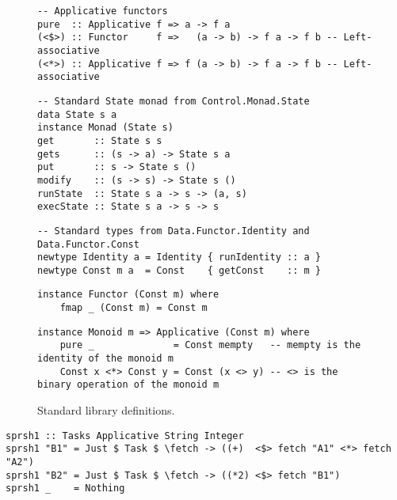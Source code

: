 \begin{figure}
\begin{verbatim}
-- Applicative functors
pure  :: Applicative f => a -> f a
(<$>) :: Functor     f =>   (a -> b) -> f a -> f b -- Left-associative
(<*>) :: Applicative f => f (a -> b) -> f a -> f b -- Left-associative
\end{verbatim}
\vspace{1mm}
\begin{verbatim}
-- Standard State monad from Control.Monad.State
data State s a
instance Monad (State s)
get       :: State s s
gets      :: (s -> a) -> State s a
put       :: s -> State s ()
modify    :: (s -> s) -> State s ()
runState  :: State s a -> s -> (a, s)
execState :: State s a -> s -> s
\end{verbatim}
\vspace{1mm}
\begin{verbatim}
-- Standard types from Data.Functor.Identity and Data.Functor.Const
newtype Identity a = Identity { runIdentity :: a }
newtype Const m a  = Const    { getConst    :: m }
\end{verbatim}
\vspace{1mm}
\begin{verbatim}
instance Functor (Const m) where
    fmap _ (Const m) = Const m
\end{verbatim}
\vspace{1mm}
\begin{verbatim}
instance Monoid m => Applicative (Const m) where
    pure _              = Const mempty   -- mempty is the identity of the monoid m
    Const x <*> Const y = Const (x <> y) -- <> is the binary operation of the monoid m
\end{verbatim}
\vspace{-3mm}
\caption{Standard library definitions.}\label{fig-stdlib}
\vspace{-4mm}
\end{figure}

\vspace{1mm}
\begin{verbatim}
sprsh1 :: Tasks Applicative String Integer
sprsh1 "B1" = Just $ Task $ \fetch -> ((+)  <$> fetch "A1" <*> fetch "A2")
sprsh1 "B2" = Just $ Task $ \fetch -> ((*2) <$> fetch "B1")
sprsh1 _    = Nothing
\end{verbatim}
\vspace{1mm}

